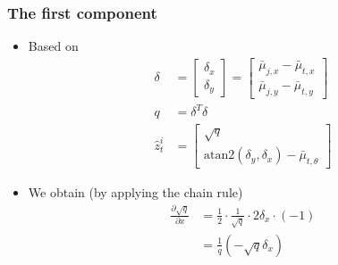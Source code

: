 \begin{frame}
    \frametitle{The first component}

    \begin{itemize}
        \item Based on
        \begin{align*}
            \delta &= 
            \begin{bmatrix}
                \delta_x \\
                \delta_y
            \end{bmatrix}
            = \begin{bmatrix}
                \bar{\mu}_{j,x} - \bar{\mu}_{t,x} \\
                \bar{\mu}_{j,y} - \bar{\mu}_{t,y}
            \end{bmatrix}\\
            q &= \delta^T \delta\\
            \hat{z}^i_t &= 
            \begin{bmatrix}
                \sqrt{q} \\
                \text{atan2}(\delta_y, \delta_x) - \bar{\mu}_{t,\theta}
            \end{bmatrix}
        \end{align*}    
    
        \item We obtain (by applying the chain rule)
        \begin{align*}
            \frac{\partial \sqrt{q}}{\partial x}
            &= \frac{1}{2} \cdot \frac{1}{\sqrt{q}} \cdot 2 \delta_x \cdot (-1)\\
            &= \frac{1}{q} \left(-\sqrt{q} \delta_x \right)
        \end{align*} 
    \end{itemize}

\end{frame}

